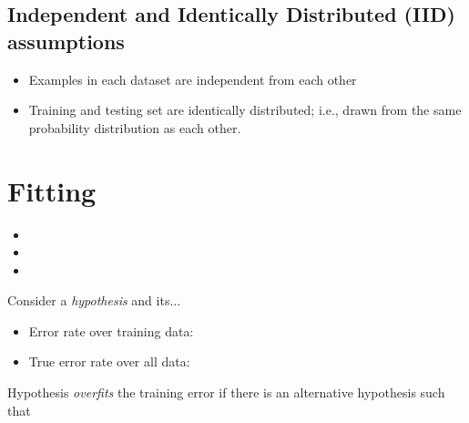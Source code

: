 \documentclass[
	number={1},
	title={Machine Learning Fundamentals}
]{cs584notes}
\begin{document}
\subsection{Independent and Identically Distributed (IID) assumptions}\label{subsec:independent-and-identically-distributed-(iid)-assumptions}
\begin{itemize}
	\item Examples in each dataset are independent from each other
	\item Training and testing set are identically distributed; i.e., drawn from the same probability distribution as each other.
\end{itemize}

\section{Fitting}\label{sec:fitting}
\begin{itemize}
	\item {}
	\item {}
	\item {}
\end{itemize}

Consider a \emph{hypothesis } and its$\dots$
\begin{itemize}
	\item Error rate over training data: 
	\item True error rate over all data: 
\end{itemize}

Hypothesis  \emph{overfits} the training error if there is an alternative hypothesis  such that
\end{document}
